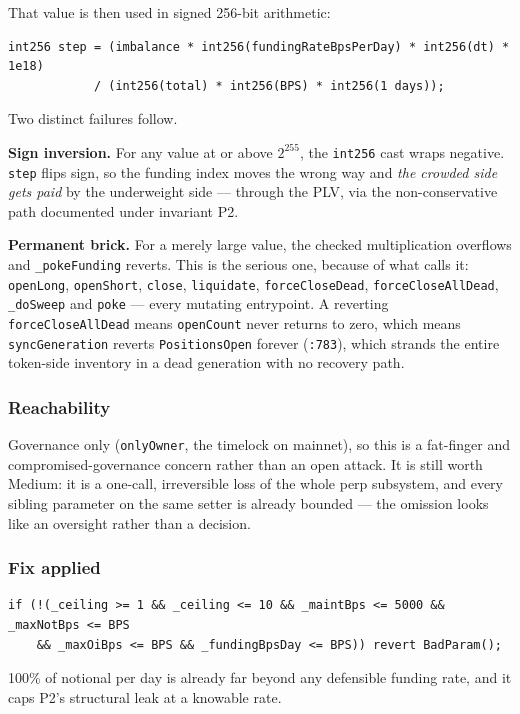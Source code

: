 \documentclass[11pt,a4paper]{article}
\newcommand{\code}[1]{\texttt{\small #1}}
\newcommand{\fileref}[1]{\texttt{\scriptsize #1}}
\begin{document}
That value is then used in signed 256-bit arithmetic:
\begin{lstlisting}
int256 step = (imbalance * int256(fundingRateBpsPerDay) * int256(dt) * 1e18)
            / (int256(total) * int256(BPS) * int256(1 days));
\end{lstlisting}

Two distinct failures follow.

\textbf{Sign inversion.} For any value at or above $2^{255}$, the
\code{int256} cast wraps negative. \code{step} flips sign, so the funding index
moves the wrong way and \emph{the crowded side gets paid} by the underweight side
--- through the PLV, via the non-conservative path documented under invariant P2.

\textbf{Permanent brick.} For a merely large value, the checked multiplication
overflows and \code{\_pokeFunding} reverts. This is the serious one, because of
what calls it: \code{openLong}, \code{openShort}, \code{close}, \code{liquidate},
\code{forceCloseDead}, \code{forceCloseAllDead}, \code{\_doSweep} and \code{poke}
--- every mutating entrypoint. A reverting \code{forceCloseAllDead} means
\code{openCount} never returns to zero, which means \code{syncGeneration} reverts
\code{PositionsOpen} forever (\fileref{:783}), which strands the entire token-side
inventory in a dead generation with no recovery path.

\subsubsection*{Reachability}

Governance only (\code{onlyOwner}, the timelock on mainnet), so this is a
fat-finger and compromised-governance concern rather than an open attack. It is
still worth Medium: it is a one-call, irreversible loss of the whole perp
subsystem, and every sibling parameter on the same setter is already bounded ---
the omission looks like an oversight rather than a decision.

\subsubsection*{Fix applied}

\begin{lstlisting}
if (!(_ceiling >= 1 && _ceiling <= 10 && _maintBps <= 5000 && _maxNotBps <= BPS
    && _maxOiBps <= BPS && _fundingBpsDay <= BPS)) revert BadParam();
\end{lstlisting}
100\% of notional per day is already far beyond any defensible funding rate, and
it caps P2's structural leak at a knowable rate.
\end{document}
